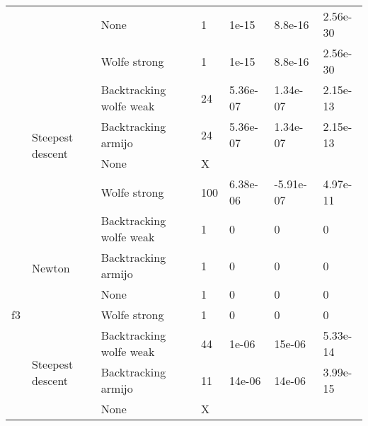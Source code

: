\documentclass[a4paper,11pt]{article}
\numberwithin{equation}{section} %
\begin{document}
\begin{table}[h!]
\begin{tabular}{|c|l|l|l|l|l|l|}
                                &                                   & None                    & 1          & 1e-15    & 8.8e-16   & 2.56e-30     \\ \cline{3-7} 
                                &                                   & Wolfe strong            & 1          & 1e-15    & 8.8e-16   & 2.56e-30     \\ \cline{2-7} 
                                & \multirow{4}{*}{Steepest descent} & Backtracking wolfe weak & 24         & 5.36e-07 & 1.34e-07  & 2.15e-13     \\ \cline{3-7} 
                                &                                   & Backtracking armijo     & 24         & 5.36e-07 & 1.34e-07  & 2.15e-13     \\ \cline{3-7} 
                                &                                   & None                    & X          &          &           &              \\ \cline{3-7} 
                                &                                   & Wolfe strong            & 100        & 6.38e-06 & -5.91e-07 & 4.97e-11     \\ \hline
\multirow{8}{*}{f3}             & \multirow{4}{*}{Newton}           & Backtracking wolfe weak & 1          & 0        & 0         & 0            \\ \cline{3-7} 
                                &                                   & Backtracking armijo     & 1          & 0        & 0         & 0            \\ \cline{3-7} 
                                &                                   & None                    & 1          & 0        & 0         & 0            \\ \cline{3-7} 
                                &                                   & Wolfe strong            & 1          & 0        & 0         & 0            \\ \cline{2-7} 
                                & \multirow{4}{*}{Steepest descent} & Backtracking wolfe weak & 44         & 1e-06    & 15e-06    & 5.33e-14     \\ \cline{3-7} 
                                &                                   & Backtracking armijo     & 11         & 14e-06   & 14e-06    & 3.99e-15     \\ \cline{3-7} 
                                &                                   & None                    & X          &          &           &              \\ \cline{3-7} 

\end{tabular}
\end{table}
\end{document}
